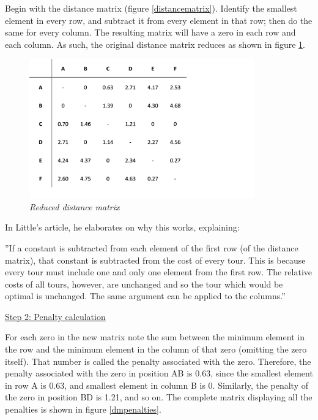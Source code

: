 \noindent
Begin with the distance matrix (figure \ref{distancematrix}). Identify the smallest element in every row, and subtract it from every element in that row; then do the same for every column. The resulting matrix will have a zero in each row and each column. As such, the original distance matrix reduces as shown in figure \ref{dmreduced}.

\begin{figure}[ht] 
	\centering
	\includegraphics[height=6cm]{dmreduced}
	\vspace{-3mm}
	\caption{\textsl{Reduced distance matrix}}
	\label{dmreduced}
\end{figure}
\noindent	
In Little’s article, he elaborates on why this works, explaining:
\vspace{-1mm}

\begin{displayquote} 
''If a constant is subtracted from each element of the first row (of the distance matrix), that constant is subtracted from the cost of every tour. This is because every tour must include one and only one element from the first row. The relative costs of all tours, however, are unchanged and so the tour which would be optimal is unchanged. The same argument can be applied to the columns.'' \cite{little}
\end{displayquote}

\vspace{3mm}	
\noindent	
\underline{Step 2: Penalty calculation}	
\vspace{1mm}

\noindent	
For each zero in the new matrix note the sum between the minimum element in the row and the minimum element in the column of that zero (omitting the zero itself). That number is called the penalty associated with the zero. Therefore, the penalty associated with the zero in position AB is 0.63, since the smallest element in row A is 0.63, and smallest element in column B is 0. Similarly, the penalty of the zero in position BD is 1.21, and so on. The complete matrix displaying all the penalties is shown in figure \ref{dmpenalties}.	

